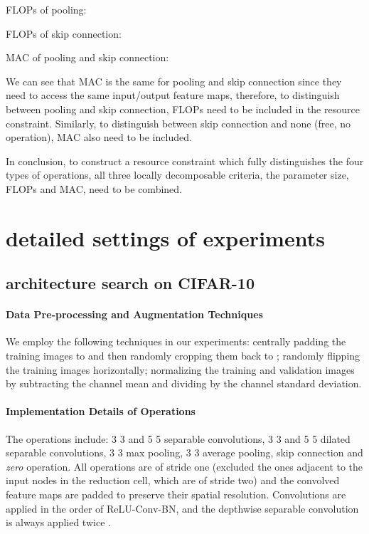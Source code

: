\documentclass{article} \usepackage{iclr2019_conference,times}
\begin{document}
FLOPs of pooling:


FLOPs of skip connection:


MAC of pooling and skip connection:


We can see that MAC is the same for pooling and skip connection since they need to access the same input/output feature maps, therefore, to distinguish between pooling and skip connection, FLOPs need to be included in the resource constraint. Similarly, to distinguish between skip connection and none (free, no operation), MAC also need to be included.

In conclusion, to construct a resource constraint which fully distinguishes the four types of operations, all three locally decomposable criteria, the parameter size, FLOPs and MAC, need to be combined.

\section{detailed settings of experiments}

\subsection{architecture search on CIFAR-10}

\paragraph{Data Pre-processing and Augmentation Techniques}

We employ the following techniques in our experiments: centrally padding the training images to  and then randomly cropping them back to ; randomly flipping the training images horizontally; normalizing the training and validation images by subtracting the channel mean and dividing by the channel standard deviation.

\paragraph{Implementation Details of Operations}

The operations include: 3  3 and 5  5 separable convolutions, 3  3 and 5  5 dilated separable convolutions, 3  3 max pooling, 3  3 average pooling, skip connection and \textit{zero} operation. All operations are of stride one (excluded the ones adjacent to the input nodes in the reduction cell, which are of stride two) and the convolved feature maps are padded to preserve their spatial resolution. Convolutions are applied in the order of ReLU-Conv-BN, and the depthwise separable convolution is always applied twice \citep{zoph2017learning, real2018regularized, liu2017progressive, liu2018darts}.
\end{document}
